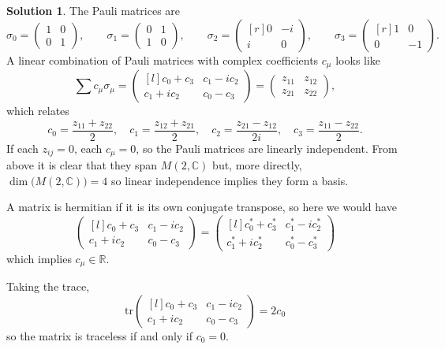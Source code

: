 \documentclass[11pt, a4paper]{report}
\theoremstyle{definition}
\newtheorem{sol}{Solution}[part]
\begin{document}
\begin{sol}

The Pauli matrices are
\[
    \sigma_0 = \begin{pmatrix}
            1 & 0 \\
            0 & 1
        \end{pmatrix}, \qquad
    \sigma_1 = \begin{pmatrix}
            0 & 1 \\
            1 & 0
        \end{pmatrix}, \qquad
    \sigma_2 = \begin{pmatrix*}[r]
            0 & -i \\
            i &  0
        \end{pmatrix*}, \qquad
    \sigma_3 = \begin{pmatrix*}[r]
            1 &  0 \\
            0 & -1
        \end{pmatrix*}.
\]
A linear combination of Pauli matrices with complex coefficients $c_\mu$ looks like
\[
    \sum c_\mu \sigma_\mu =
        \begin{pmatrix*}[l]
            c_0 + c_3  & c_1 - ic_2 \\
            c_1 + ic_2 & c_0 - c_3
        \end{pmatrix*}
    = \begin{pmatrix}
        z_{11} & z_{12} \\
        z_{21} & z_{22}
    \end{pmatrix},
\]
which relates
\[
    c_0 = \frac{z_{11} + z_{22}}{2}, \quad
    c_1 = \frac{z_{12} + z_{21}}{2}, \quad
    c_2 = \frac{z_{21} - z_{12}}{2i}, \quad
    c_3 = \frac{z_{11} - z_{22}}{2}.
\]
If each $z_{ij} = 0$, each $c_\mu = 0$, so the Pauli matrices are linearly independent.
From above it is clear that they span $M(2, \mathbb{C})$ but, more directly, $\dim \bigl( M(2, \mathbb{C}) \bigr) = 4$ so linear independence implies they form a basis.

A matrix is hermitian if it is its own conjugate transpose, so here we would have
\[
        \begin{pmatrix*}[l]
            c_0 + c_3  & c_1 - ic_2 \\
            c_1 + ic_2 & c_0 - c_3
        \end{pmatrix*}
        =
        \begin{pmatrix*}[l]
            c_0^* + c_3^*  & c_1^* - ic_2^* \\
            c_1^* + ic_2^* & c_0^* - c_3^*
        \end{pmatrix*}
\]
which implies $c_\mu \in \mathbb{R}$.

Taking the trace,
\[
    \text{tr} \begin{pmatrix*}[l]
                c_0 + c_3  & c_1 - ic_2 \\
                c_1 + ic_2 & c_0 - c_3
              \end{pmatrix*}
        = 2 c_0
\]
so the matrix is traceless if and only if $c_0 = 0$.

\end{sol}
\end{document}
